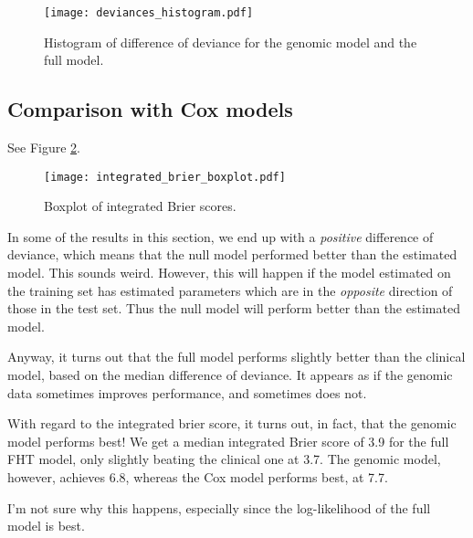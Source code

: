 \begin{figure}
\caption{Histogram of difference of deviance for the genomic model and the full model.}
\label{fig:neuroblastoma-deviances-histo}
\centering
\texttt{[image: deviances\_histogram.pdf]}
\end{figure}


\subsection{Comparison with Cox models}
See Figure \ref{fig:neuroblastoma-integrated-brier}.
\begin{figure}
\caption{Boxplot of integrated Brier scores.}
\label{fig:neuroblastoma-integrated-brier}
\centering
\texttt{[image: integrated\_brier\_boxplot.pdf]}
\end{figure}

In some of the results in this section, we end up with a \textit{positive} difference of deviance, which means that the null model performed better than the estimated model.
This sounds weird.
However, this will happen if the model estimated on the training set has estimated parameters which are in the \textit{opposite} direction of those in the test set.
Thus the null model will perform better than the estimated model.

Anyway, it turns out that the full model performs slightly better than the clinical model, based on the median difference of deviance.
It appears as if the genomic data sometimes improves performance, and sometimes does not.

With regard to the integrated brier score, it turns out, in fact, that the genomic model performs best!
We get a median integrated Brier score of 3.9 for the full FHT model, only slightly beating the clinical one at 3.7.
The genomic model, however, achieves 6.8, whereas the Cox model performs best, at 7.7.

I'm not sure why this happens, especially since the log-likelihood of the full model is best.



